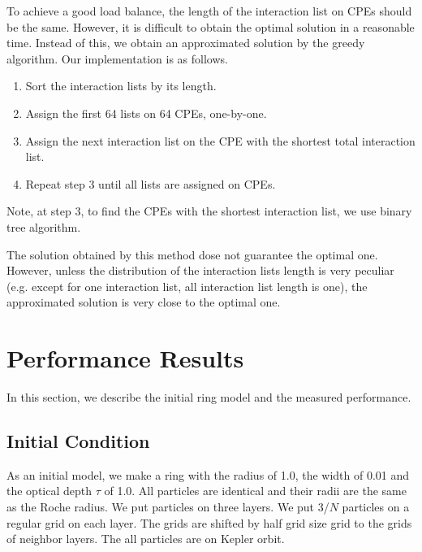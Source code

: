 \documentclass[oribibl]{llncs}
\begin{document}
To achieve a good load balance, the length of the interaction list on
CPEs should be the same. However, it is difficult to obtain the
optimal solution in a reasonable time. Instead of this, we obtain an
approximated solution by the greedy algorithm. Our implementation is
as follows.

\begin{enumerate}
  
\item Sort the interaction lists by its length.

\item Assign the first 64 lists on 64 CPEs, one-by-one.

\item Assign the next interaction list on the CPE with the shortest
  total interaction list.

\item Repeat step 3 until all lists are assigned on CPEs.

\end{enumerate}
  
Note, at step 3, to find the CPEs with the shortest interaction list,
we use binary tree algorithm.

The solution obtained by this method dose not guarantee the optimal
one. However, unless the distribution of the interaction lists length
is very peculiar (e.g. except for one interaction list, all
interaction list length is one), the approximated solution is very
close to the optimal one.

\section{Performance Results}
\label{sec:result}

In this section, we describe the initial ring model and the measured
performance. 

\subsection{Initial Condition}

As an initial model, we make a ring with the radius of 1.0, the width
of 0.01 and the optical depth $\tau$ of 1.0. All particles are
identical and their radii are the same as the Roche radius. We put
particles on three layers. We put 3/$N$ particles on a regular grid on
each layer. The grids are shifted by half grid size grid to the grids
of neighbor layers. The all particles are on Kepler orbit.
\end{document}
